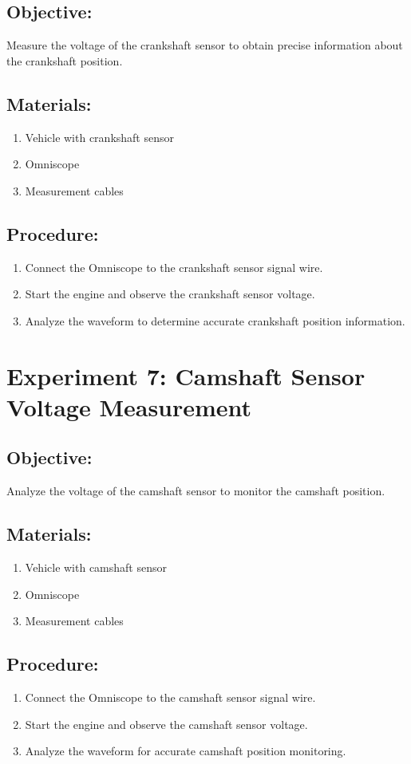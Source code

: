 \documentclass[]{scrreprt}
\begin{document}
    \subsection*{Objective:} Measure the voltage of the crankshaft sensor to obtain precise information about the crankshaft position.
    \subsection*{Materials:}
    \begin{enumerate}
        \item Vehicle with crankshaft sensor
        \item Omniscope
        \item Measurement cables
    \end{enumerate}
    \subsection*{Procedure:}
    \begin{enumerate}
        \item Connect the Omniscope to the crankshaft sensor signal wire.
        \item Start the engine and observe the crankshaft sensor voltage.
        \item Analyze the waveform to determine accurate crankshaft position information.
    \end{enumerate}

    \section*{Experiment 7: Camshaft Sensor Voltage Measurement}
    \subsection*{Objective:} Analyze the voltage of the camshaft sensor to monitor the camshaft position.
    \subsection*{Materials:}
    \begin{enumerate}
        \item Vehicle with camshaft sensor
        \item Omniscope
        \item Measurement cables
    \end{enumerate}
    \subsection*{Procedure:}
    \begin{enumerate}
        \item Connect the Omniscope to the camshaft sensor signal wire.
        \item Start the engine and observe the camshaft sensor voltage.
        \item Analyze the waveform for accurate camshaft position monitoring.
    \end{enumerate}
\end{document}
